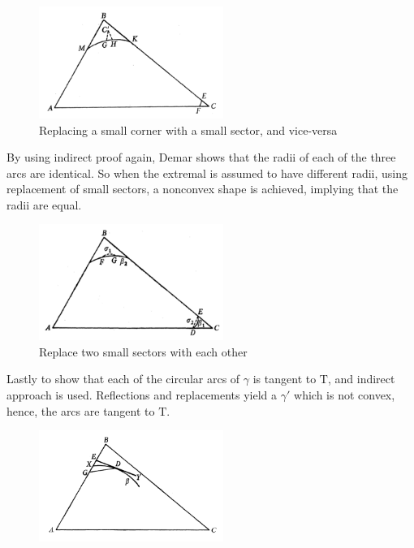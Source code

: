 \documentclass[a4paper]{book}
\numberwithin{theorem}{section}%
\begin{document}
\begin{itemize}
    \begin{figure}[hbt!]
        \begin{center}   
            \includegraphics[width=60mm]{Demar1}
            \caption{Replacing a small corner with a small sector, and vice-versa}
        \end{center}
    \end{figure}\leavevmode
    By using indirect proof again, Demar shows that the radii of each of the three arcs are identical. So when the extremal is assumed to have different radii, using replacement of small sectors, a nonconvex shape is achieved, implying that the radii are equal.
    \begin{figure}[hbt!]
        \begin{center}   
            \includegraphics[width=60mm]{Demar2}
            \caption{Replace two small sectors with each other}
        \end{center}
    \end{figure}\leavevmode
    Lastly to show that each of the circular arcs of $\gamma$ is tangent to $\mathrm{T}$, and indirect approach is used. Reflections and replacements yield a $\gamma'$ which is not convex, hence, the arcs are tangent to $\mathrm{T}$.
    \begin{figure}[hbt!]
        \begin{center}   
            \includegraphics[width=60mm]{Demar3}

\end{center}
\end{figure}
\end{itemize}
\end{document}
